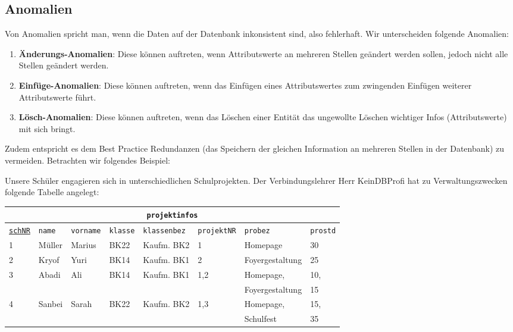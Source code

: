 \subsection[Anomalien]{Anomalien}\label{Anomalien}
Von Anomalien spricht man, wenn die Daten auf der Datenbank inkonsistent sind, also fehlerhaft. Wir unterscheiden folgende Anomalien:

\begin{tcolorbox}[title=Anomalien]
	\begin{enumerate}
		\item \textbf{Änderungs-Anomalien}: Diese können auftreten, wenn Attributswerte an mehreren Stellen geändert werden sollen, jedoch nicht alle Stellen geändert werden.
		\item \textbf{Einfüge-Anomalien}: Diese können auftreten, wenn das Einfügen eines Attributswertes zum zwingenden Einfügen weiterer Attributswerte führt.
		\item \textbf{Lösch-Anomalien}: Diese können auftreten, wenn das Löschen einer Entität das ungewollte Löschen wichtiger Infos (Attributswerte) mit sich bringt.
	\end{enumerate}
\end{tcolorbox}
Zudem entspricht es dem Best Practice Redundanzen (das Speichern der gleichen Information an mehreren Stellen in der Datenbank) zu vermeiden. Betrachten wir folgendes Beispiel:

Unsere Schüler engagieren sich in unterschiedlichen Schulprojekten. Der Verbindungslehrer Herr KeinDBProfi hat zu Verwaltungszwecken folgende Tabelle angelegt:
\begin{tabular}{llllllll}
	\multicolumn{8}{c}{\lstinline!projektinfos!}\\
	\hline
	\underline{\lstinline!schNR!}&\lstinline!name!&\lstinline!vorname!&\lstinline!klasse!&\lstinline!klassenbez!&\lstinline!projektNR!&\lstinline!probez!&\lstinline!prostd!\\
	\hline
	1 &
	Müller &
	Marius &
	BK22 &
	Kaufm. BK2&
	1 &
	Homepage &
	30 \\
	2 &
	Kryof  &
	Yuri &
	BK14 &
	Kaufm. BK1&
	2 &
	Foyergestaltung &
	25 \\
	3 &
	Abadi &
	Ali &
	BK14 &
	Kaufm. BK1&
	1,2 &
	Homepage,&
	10,\\
	&&&&&&Foyergestaltung&15\\
	4 &
	Sanbei &
	Sarah &
	BK22 &
	Kaufm. BK2 &
	1,3 &
	Homepage,&
	15,  \\
	&&&&&&Schulfest&35\\
\end{tabular}

